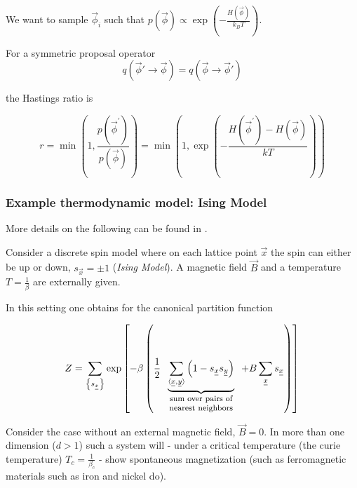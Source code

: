 We want to sample $\vec{\phi}_i$ such that $p(\vec{\phi}) \propto \exp{\left( -\frac{H(\vec{\phi})}{k_B T} \right)}$.

For a symmetric proposal operator
\begin{equation}
    q(\vec{\phi}' \rightarrow \vec{\phi}) = q(\vec{\phi} \rightarrow \vec{\phi}')
\end{equation}

the Hastings ratio is

\begin{equation}
    r=\min \left(1, \frac{p\left(\vec{\phi}^{\prime}\right)}{p(\vec{\phi})}\right)=\min \left(1, \exp \left(-\frac{H\left(\vec{\phi}^{\prime}\right)-H(\vec{\phi})}{k T}\right)\right)
\end{equation}


\subsubsection{Example thermodynamic model: Ising Model}
More details on the following can be found in \cite[chapter 17]{gould96}.

Consider a discrete spin model where on each lattice point $\vec{x}$ the spin
can either be up or down, $s_\vec{x} = \pm 1$ (\textit{Ising Model}). A magnetic
field $\vec{B}$ and a temperature $T = \frac{1}{\beta}$ are externally given.

In this setting one obtains for the canonical partition function

\begin{equation}
    Z=\sum_{\left\{s_{\vec{x}}\right\}} \exp \left[-\beta\left(\frac{1}{2} \explain{\sum_{\langle\vec{x}, \vec{y}\rangle}\left(1-s_{\vec{x}} s_{\vec{y}}\right)}{sum over pairs of nearest neighbors}+B \sum_{\vec{x}} s_{\vec{x}}\right)\right]
\end{equation}

Consider the case without an external magnetic field, $\vec{B} = 0$. In more than one dimension ($d>1$)
such a system will - under a critical temperature (the curie temperature) $T_c = \frac{1}{\beta_c}$ - show spontaneous
magnetization (such as ferromagnetic materials such as iron and nickel do).

